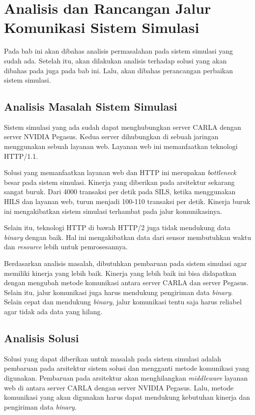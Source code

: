 \chapter{Analisis dan Rancangan Jalur Komunikasi Sistem Simulasi}

Pada bab ini akan dibahas analisis permasalahan pada sistem simulasi yang sudah
ada. Setelah itu, akan dilakukan analisis terhadap solusi yang akan dibahas pada
juga pada bab ini. Lalu, akan dibahas perancangan perbaikan sistem simulasi.

\section{Analisis Masalah Sistem Simulasi}

Sistem simulasi yang ada sudah dapat menghubungkan server CARLA dengan server
NVIDIA Pegasus. Kedua server dihubungkan di sebuah jaringan menggunakan sebuah
layanan web. Layanan web ini memanfaatkan teknologi HTTP/1.1.

Solusi yang memanfaatkan layanan web dan HTTP ini merupakan \textit{bottleneck}
besar pada sistem simulasi. Kinerja yang diberikan pada arsitektur sekarang
sangat buruk. Dari 4000 transaksi per detik pada SILS, ketika menggunakan HILS
dan layanan web, turun menjadi 100-110 transaksi per detik. Kinerja buruk ini
mengakibatkan sistem simulasi terhambat pada jalur komunikasinya.

Selain itu, teknologi HTTP di bawah HTTP/2 juga tidak mendukung data
\textit{binary} dengan baik. Hal ini mengakibatkan data dari sensor membutuhkan
waktu dan \textit{resource} lebih untuk pemrosesannya.

Berdasarkan analisis masalah, dibutuhkan pembaruan pada sistem simulasi agar
memiliki kinerja yang lebih baik. Kinerja yang lebih baik ini bisa didapatkan
dengan mengubah metode komunikasi antara server CARLA dan server Pegasus. Selain
itu, jalur komunikasi juga harus mendukung pengiriman data \textit{binary}.
Selain cepat dan mendukung \textit{binary}, jalur komunikasi tentu saja harus
reliabel agar tidak ada data yang hilang.

\section{Analisis Solusi}

Solusi yang dapat diberikan untuk masalah pada sistem simulasi adalah pembaruan
pada arsitektur sistem solusi dan mengganti metode komunikasi yang digunakan.
Pembaruan pada arsitektur akan menghilangkan \textit{middleware} layanan web di
antara server CARLA dengan server NVIDIA Pegasus. Lalu, metode komunikasi yang
akan digunakan harus dapat mendukung kebutuhan kinerja dan pengiriman data
\textit{binary}.

